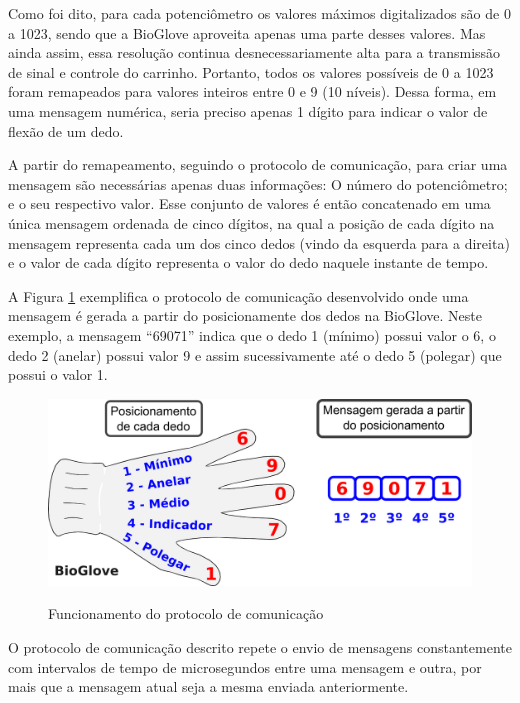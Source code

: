 \documentclass[
	12pt,				%
	openright,			%
	oneside,			%
	a4paper,			%
	english,			%
	brazil				%
	]{abntex2}
\begin{document}
		Como foi dito, para cada potenciômetro os valores máximos digitalizados são de 0 a 1023, sendo que a BioGlove aproveita apenas uma parte desses valores. Mas ainda assim, essa resolução continua desnecessariamente alta para a transmissão de sinal e controle do carrinho. Portanto, todos os valores possíveis de 0 a 1023 foram remapeados para valores inteiros entre 0 e 9 (10 níveis). Dessa forma, em uma mensagem numérica, seria preciso apenas 1 dígito para indicar o valor de flexão de um dedo. 
		
		A partir do remapeamento, seguindo o protocolo de comunicação, para criar uma mensagem são necessárias apenas duas informações: O número do potenciômetro; e o seu respectivo valor. Esse conjunto de valores é então concatenado em uma única mensagem ordenada de cinco dígitos, na qual a posição de cada dígito na mensagem representa cada um dos cinco dedos (vindo da esquerda para a direita) e o valor de cada dígito representa o valor do dedo naquele instante de tempo.  
		
		A Figura \ref{Fig:glove-create-msg1} exemplifica o protocolo de comunicação desenvolvido onde uma mensagem é gerada a partir do posicionamente dos dedos na BioGlove. Neste exemplo, a mensagem ``69071'' indica que o dedo 1 (mínimo) possui valor o 6, o dedo 2 (anelar) possui valor 9 e assim sucessivamente até o dedo 5 (polegar) que possui o valor 1.


		\begin{figure}[h!]
			\centering
			\caption{Funcionamento do protocolo de comunicação}
  		\includegraphics[width=12cm]{./figures/glove-create-msg1.png}
  		\label{Fig:glove-create-msg1}
		\end{figure}
		

		O protocolo de comunicação descrito repete o envio de mensagens constantemente com intervalos de tempo de microsegundos entre uma mensagem e outra, por mais que a mensagem atual seja a mesma enviada anteriormente.   
		
\end{document}
